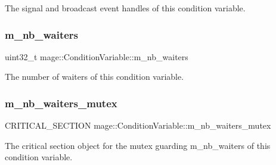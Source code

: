 The signal and broadcast event handles of this condition variable. \hypertarget{structmage_1_1_condition_variable_ac02cb14000a597ec91b8546bdcbb9dd1}{}\label{structmage_1_1_condition_variable_ac02cb14000a597ec91b8546bdcbb9dd1} 
\subsubsection{\texorpdfstring{m\+\_\+nb\+\_\+waiters}{m\_nb\_waiters}}
{\footnotesize\ttfamily uint32\+\_\+t mage\+::\+Condition\+Variable\+::m\+\_\+nb\+\_\+waiters\hspace{0.3cm}{\ttfamily [private]}}

The number of waiters of this condition variable. \hypertarget{structmage_1_1_condition_variable_a0686e682d62d44ff1eb9ac45acbb0eab}{}\label{structmage_1_1_condition_variable_a0686e682d62d44ff1eb9ac45acbb0eab} 
\subsubsection{\texorpdfstring{m\+\_\+nb\+\_\+waiters\+\_\+mutex}{m\_nb\_waiters\_mutex}}
{\footnotesize\ttfamily C\+R\+I\+T\+I\+C\+A\+L\+\_\+\+S\+E\+C\+T\+I\+ON mage\+::\+Condition\+Variable\+::m\+\_\+nb\+\_\+waiters\+\_\+mutex\hspace{0.3cm}{\ttfamily [private]}}

The critical section object for the mutex guarding {\ttfamily m\+\_\+nb\+\_\+waiters} of this condition variable. 